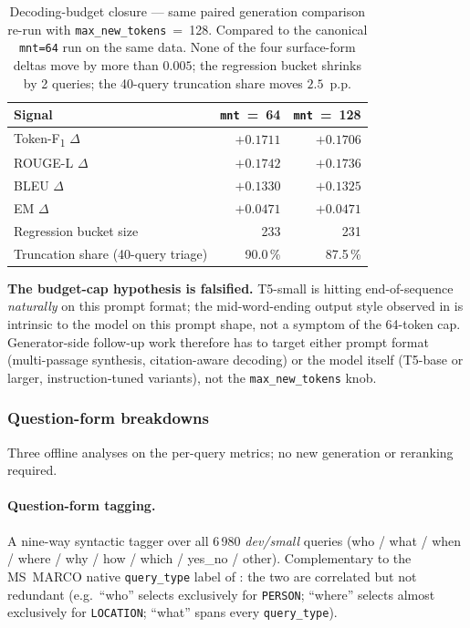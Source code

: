 \documentclass[11pt,a4paper]{article}
\newcommand{\devsmall}{\textit{dev/small}}
\newcommand{\fdev}{6\,980}
\newcommand{\msmarco}{MS~MARCO}
\newcommand{\F}{F\textsubscript{1}}
\newcommand{\Tokenf}{Token-\F}
\newcommand{\rougel}{ROUGE-L}
\begin{document}
\begin{table}[H]
  \centering
  \caption{Decoding-budget closure --- same paired generation comparison
  re-run with \texttt{max\_new\_tokens}~=~128.  Compared to the
  canonical \texttt{mnt=64} run on the same data.  None of the four
  surface-form deltas move by more than $0.005$; the regression
  bucket shrinks by 2 queries; the 40-query truncation share moves
  $2.5$~p.p.}
  \label{tab:w6-closure}
  \begin{tabular}{lrr}
    \toprule
    Signal                              & \texttt{mnt}~=~64 & \texttt{mnt}~=~128 \\
    \midrule
    \Tokenf{} $\Delta$                  & $+0.1711$ & $+0.1706$ \\
    \rougel{} $\Delta$                  & $+0.1742$ & $+0.1736$ \\
    BLEU $\Delta$                       & $+0.1330$ & $+0.1325$ \\
    EM $\Delta$                         & $+0.0471$ & $+0.0471$ \\
    Regression bucket size              & 233       & 231       \\
    Truncation share (40-query triage)  & 90.0\,\%  & 87.5\,\%  \\
    \bottomrule
  \end{tabular}
\end{table}

\textbf{The budget-cap hypothesis is falsified.}  T5-small is
hitting end-of-sequence \emph{naturally} on this prompt format;
the mid-word-ending output style observed in
 is intrinsic to the model on this prompt
shape, not a symptom of the 64-token cap.  Generator-side follow-up
work therefore has to target either prompt format (multi-passage
synthesis, citation-aware decoding) or the model itself
(T5-base or larger, instruction-tuned variants), not the
\texttt{max\_new\_tokens} knob.

\subsubsection{Question-form breakdowns}
\label{sec:w6-followups}

Three offline analyses on the per-query metrics; no new generation
or reranking required.

\paragraph{Question-form tagging.}  A nine-way syntactic
tagger over all \fdev{} \devsmall{} queries (who / what / when /
where / why / how / which / yes\_no / other).  Complementary to the
\msmarco{} native \texttt{query\_type} label of
: the two are correlated but not
redundant (e.g.\ ``who'' selects exclusively for \texttt{PERSON};
``where'' selects almost exclusively for \texttt{LOCATION}; ``what''
spans every \texttt{query\_type}).
\end{document}
